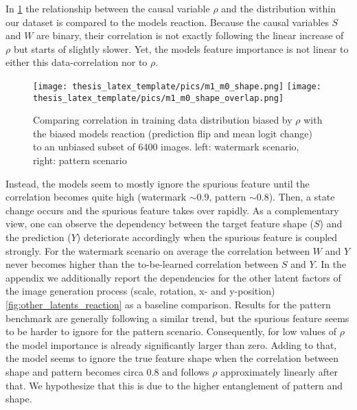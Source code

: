In \cref{fig:m0_m1} the relationship between the causal variable $\rho$ and the distribution within our dataset is compared to the models reaction. Because the causal variables $S$ and $W$ are binary, their correlation is not exactly following the linear increase of $\rho$ but starts of slightly slower. Yet, the models feature importance is not linear to either this data-correlation nor to $\rho$.

\begin{figure}[t!]
\centering
    \texttt{[image: thesis\_latex\_template/pics/m1\_m0\_shape.png]}
    \texttt{[image: thesis\_latex\_template/pics/m1\_m0\_shape\_overlap.png]}
    \caption[Data Distribution $m_0$ vs. Model Importance $m_1$]{Comparing correlation in training data distribution biased by $\rho$ with the biased models reaction (prediction flip and mean logit change) to an unbiased subset of 6400 images. left: watermark scenario, right: pattern scenario }
    \label{fig:m0_m1}
\end{figure}

Instead, the models seem to mostly ignore the spurious feature until the correlation becomes quite high (watermark $\sim 0.9$, pattern $\sim 0.8$). Then, a state change  occurs and the spurious feature takes over rapidly. As a complementary view, one can observe the dependency between the target feature shape ($S$) and the prediction ($Y$) deteriorate accordingly when the spurious feature is coupled strongly. For the watermark scenario on average the correlation between $W$ and $Y$ never becomes higher than the to-be-learned correlation between $S$ and $Y$. In the appendix we additionally report the dependencies for the other latent factors of the image generation process (scale, rotation, x- and y-position) \cref{fig:other_latents_reaction} as a baseline comparison.
Results for the pattern benchmark are generally following a similar trend, but the spurious feature seems to be harder to ignore for the pattern scenario. Consequently, for low values of $\rho$ the model importance is already significantly larger than zero. Adding to that, the model seems to ignore the true feature shape when the correlation between shape and pattern becomes circa 0.8 and follows $\rho$ approximately linearly after that. We hypothesize that this is due to the higher entanglement of pattern and shape. 

